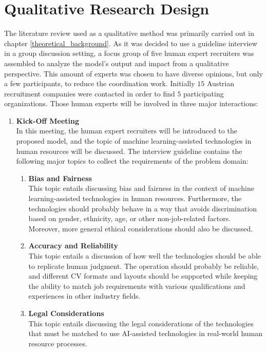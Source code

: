 \documentclass[draft,final]{thesisclass} %
\begin{document}
\section{Qualitative Research Design} \label{qualitative_research_design}
The literature review used as a qualitative method was primarily carried out in chapter \ref{theoretical_background}.
As it was decided to use a guideline interview in a group discussion setting, a focus group of five human expert recruiters was assembled to analyze the model's output and impact from a qualitative perspective.
This amount of experts was chosen to have diverse opinions, but only a few participants, to reduce the coordination work.
Initially $15$ Austrian recruitment companies were contacted in order to find $5$ participating organizations.
Those human experts will be involved in three major interactions:
\begin{enumerate}
    \item \textbf{Kick-Off Meeting} \label{kick_off_meeting}\\ 
    In this meeting, the human expert recruiters will be introduced to the proposed model, and the topic of machine learning-assisted technologies in human resources will be discussed.
    The interview guideline contains the following major topics to collect the requirements of the problem domain:
    \begin{enumerate}
        \item \textbf{Bias and Fairness}\\
        This topic entails discussing bias and fairness in the context of machine learning-assisted technologies in human resources.
        Furthermore, the technologies should probably behave in a way that avoids discrimination based on gender, ethnicity, age, or other non-job-related factors.
        Moreover, more general ethical considerations should also be discussed.
        \item \textbf{Accuracy and Reliability}\\
        This topic entails a discussion of how well the technologies should be able to replicate human judgment.
        The operation should probably be reliable, and different \acs{CV} formats and layouts should be supported while keeping the ability to match job requirements with various qualifications and experiences in other industry fields.
        \item \textbf{Legal Considerations}\\
        This topic entails discussing the legal considerations of the technologies that must be matched to use \acs{AI}-assisted technologies in real-world human resource processes.

\end{enumerate}
\end{enumerate}
\end{document}
